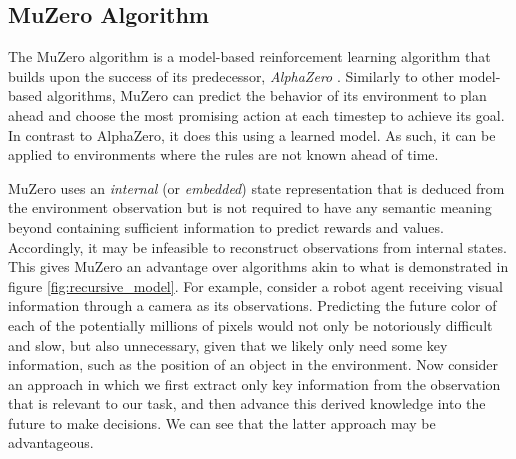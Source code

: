 \newcommand{\policy}{\text{\textbf{p}}}
\newcommand{\svalue}{\mathfrak{v}}

\subsection{MuZero Algorithm}
The MuZero algorithm \cite{muzero} is a model-based reinforcement learning algorithm that builds upon the success of its predecessor, \textit{AlphaZero} \cite{alphazero}. Similarly to other model-based algorithms, MuZero can predict the behavior of its environment to plan ahead and choose the most promising action at each timestep to achieve its goal. In contrast to AlphaZero, it does this using a learned model. As such, it can be applied to environments where the rules are not known ahead of time.

MuZero uses an \textit{internal} (or \textit{embedded}) state representation that is deduced from the environment observation but is not required to have any semantic meaning beyond containing sufficient information to predict rewards and values. Accordingly, it may be infeasible to reconstruct observations from internal states. This gives MuZero an advantage over algorithms akin to what is demonstrated in figure \ref{fig:recursive_model}. For example, consider a robot agent receiving visual information through a camera as its observations. Predicting the future color of each of the potentially millions of pixels would not only be notoriously difficult and slow, but also unnecessary, given that we likely only need some key information, such as the position of an object in the environment. Now consider an approach in which we first extract only key information from the observation that is relevant to our task, and then advance this derived knowledge into the future to make decisions. We can see that the latter approach may be advantageous.


